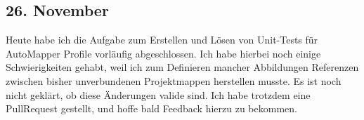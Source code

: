 \subsection{26. November}
Heute habe ich die Aufgabe zum Erstellen und Lösen von Unit-Tests für AutoMapper Profile vorläufig abgeschlossen. Ich habe hierbei noch einige Schwierigkeiten gehabt, weil ich zum Definieren mancher Abbildungen Referenzen zwischen bisher unverbundenen Projektmappen herstellen musste. Es ist noch nicht geklärt, ob diese Änderungen valide sind. Ich habe trotzdem eine PullRequest gestellt, und hoffe bald Feedback hierzu zu bekommen.